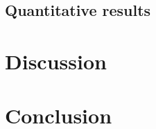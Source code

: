 \documentclass[twoside,11pt]{article}
\begin{document}
\subsection{Quantitative results}



\section{Discussion}
\label{sec:dis}



\section{Conclusion}
\label{sec:conc}



\vskip 0.2in

\end{document}
